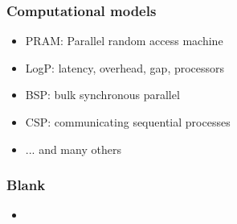 \begin{frame}[fragile]
%
  \frametitle{Computational models}
%
  \begin{itemize}
%
  \item PRAM: Parallel random access machine
  \item LogP: latency, overhead, gap, processors
  \item BSP: bulk synchronous parallel
  \item CSP: communicating sequential processes
  \item ... and many others
%
  \end{itemize}
%
\end{frame}

\begin{frame}[fragile]
%
  \frametitle{Blank}
%
  \begin{itemize}
%
  \item 
%
  \end{itemize}
%
\end{frame}

